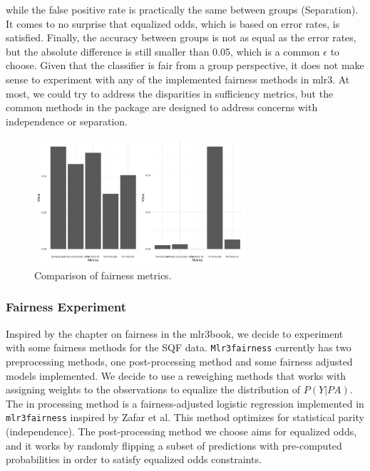 while the false positive rate is practically the same between groups (Separation). It comes to no surprise that equalized odds, which is based on error rates, is satisfied. Finally, the accuracy between groups is not as equal as the error rates, but the absolute difference is still smaller than 0.05, which is a common $\epsilon$ to choose.
Given that the classifier is fair from a group perspective, it does not make sense to experiment with any of the implemented fairness methods in mlr3. At most, we could try to address the disparities in sufficiency metrics, but the common methods in the package are designed to address concerns with independence or separation. \\
\begin{figure}
    \centering
    \includegraphics[width=0.7\textwidth]{../figures/sqf_case_study_plot8.png}
    \caption{Comparison of fairness metrics.}
    \label{fig:fairness_metrics_barplot}
\end{figure}

\subsubsection*{Fairness Experiment}
Inspired by the chapter on fairness in the mlr3book, we decide to experiment with some fairness methods for the SQF data. \texttt{Mlr3fairness} currently has two preprocessing methods, one post-processing method and some fairness adjusted models implemented. We decide to use a reweighing methods that works with assigning weights to the observations to equalize the distribution of $P(Y|PA)$.
The in processing method is a fairness-adjusted logistic regression implemented in \texttt{mlr3fairness} inspired by Zafar et al. This method optimizes for statistical parity (independence). The post-processing method we choose aims for equalized odds, and it works by randomly flipping a subset of predictions with pre-computed probabilities in order to satisfy equalized odds constraints.

